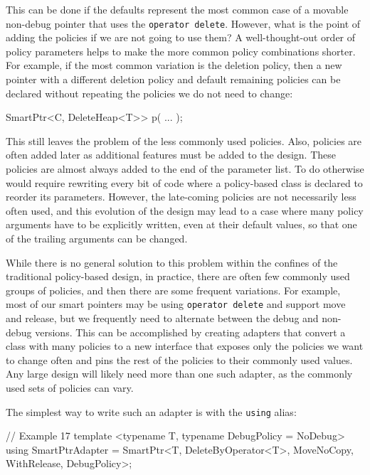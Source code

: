 This can be done if the defaults represent the most common case of a movable non-debug pointer that uses the \texttt{operator\ delete}. However, what is the point of adding the policies if we are not going to use them? A well-thought-out order of policy parameters helps to make the more common policy combinations shorter. For example, if the most common variation is the deletion policy, then a new pointer with a different deletion policy and default remaining policies can be declared without repeating the policies we do not need to change:

\begin{code}
SmartPtr<C, DeleteHeap<T>> p( ... );
\end{code}

This still leaves the problem of the less commonly used policies. Also, policies are often added later as additional features must be added to the design. These policies are almost always added to the end of the parameter list. To do otherwise would require rewriting every bit of code where a policy-based class is declared to reorder its parameters. However, the late-coming policies are not necessarily less often used, and this evolution of the design may lead to a case where many policy arguments have to be explicitly written, even at their default values, so that one of the trailing arguments can be changed.

While there is no general solution to this problem within the confines of the traditional policy-based design, in practice, there are often few commonly used groups of policies, and then there are some frequent variations. For example, most of our smart pointers may be using \texttt{operator\ delete} and support move and release, but we frequently need to alternate between the debug and non-debug versions. This can be accomplished by creating adapters that convert a class with many policies to a new interface that exposes only the policies we want to change often and pins the rest of the policies to their commonly used values. Any large design will likely need more than one such adapter, as the commonly used sets of policies can vary.

The simplest way to write such an adapter is with the \texttt{using} alias:

\begin{code}
// Example 17
template <typename T, typename DebugPolicy = NoDebug>
using SmartPtrAdapter =
  SmartPtr<T, DeleteByOperator<T>, MoveNoCopy,
              WithRelease, DebugPolicy>;
\end{code}

